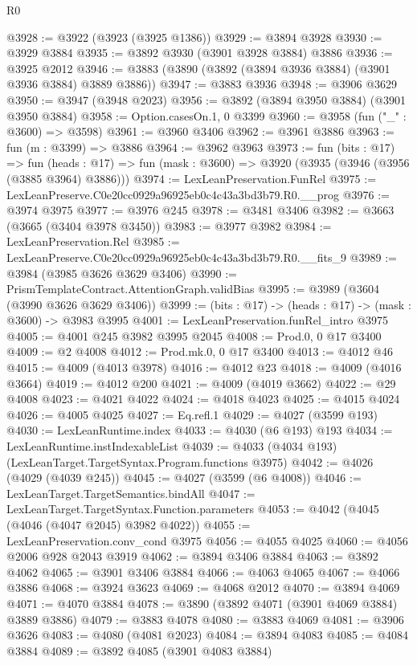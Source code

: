 \begin{lexlean}{R0}
\begin{coremodule}
@3928 := @3922 (@3923 (@3925 @1386))
@3929 := @3894 @3928
@3930 := @3929 @3884
@3935 := @3892 @3930 (@3901 @3928 @3884) @3886
@3936 := @3925 @2012
@3946 := @3883 (@3890 (@3892 (@3894 @3936 @3884) (@3901 @3936 @3884) @3889 @3886))
@3947 := @3883 @3936
@3948 := @3906 @3629
@3950 := @3947 (@3948 @2023)
@3956 := @3892 (@3894 @3950 @3884) (@3901 @3950 @3884)
@3958 := Option.casesOn.{1, 0} @3399
@3960 := @3958 (fun ("_" : @3600) => @3598)
@3961 := @3960 @3406
@3962 := @3961 @3886
@3963 := fun (m : @3399) => @3886
@3964 := @3962 @3963
@3973 := fun (bits : @17) =>
  fun (heads : @17) => fun (mask : @3600) => @3920 (@3935 (@3946 (@3956 (@3885 @3964) @3886)))
@3974 := LexLeanPreservation.FunRel
@3975 := LexLeanPreserve.C0e20cc0929a96925eb0c4c43a3bd3b79.R0.__prog
@3976 := @3974 @3975
@3977 := @3976 @245
@3978 := @3481 @3406
@3982 := @3663 (@3665 (@3404 @3978 @3450))
@3983 := @3977 @3982
@3984 := LexLeanPreservation.Rel
@3985 := LexLeanPreserve.C0e20cc0929a96925eb0c4c43a3bd3b79.R0.__fits_9
@3989 := @3984 (@3985 @3626 @3629 @3406)
@3990 := PrismTemplateContract.AttentionGraph.validBias
@3995 := @3989 (@3604 (@3990 @3626 @3629 @3406))
@3999 := (bits : @17) -> (heads : @17) -> (mask : @3600) -> @3983 @3995
@4001 := LexLeanPreservation.funRel_intro @3975
@4005 := @4001 @245 @3982 @3995 @2045
@4008 := Prod.{0, 0} @17 @3400
@4009 := @2 @4008
@4012 := Prod.mk.{0, 0} @17 @3400
@4013 := @4012 @46
@4015 := @4009 (@4013 @3978)
@4016 := @4012 @23
@4018 := @4009 (@4016 @3664)
@4019 := @4012 @200
@4021 := @4009 (@4019 @3662)
@4022 := @29 @4008
@4023 := @4021 @4022
@4024 := @4018 @4023
@4025 := @4015 @4024
@4026 := @4005 @4025
@4027 := Eq.refl.{1}
@4029 := @4027 (@3599 @193)
@4030 := LexLeanRuntime.index
@4033 := @4030 (@6 @193) @193
@4034 := LexLeanRuntime.instIndexableList
@4039 := @4033 (@4034 @193) (LexLeanTarget.TargetSyntax.Program.functions @3975)
@4042 := @4026 (@4029 (@4039 @245))
@4045 := @4027 (@3599 (@6 @4008))
@4046 := LexLeanTarget.TargetSemantics.bindAll
@4047 := LexLeanTarget.TargetSyntax.Function.parameters
@4053 := @4042 (@4045 (@4046 (@4047 @2045) @3982 @4022))
@4055 := LexLeanPreservation.conv_cond @3975
@4056 := @4055 @4025
@4060 := @4056 @2006 @928 @2043 @3919
@4062 := @3894 @3406 @3884
@4063 := @3892 @4062
@4065 := @3901 @3406 @3884
@4066 := @4063 @4065
@4067 := @4066 @3886
@4068 := @3924 @3623
@4069 := @4068 @2012
@4070 := @3894 @4069
@4071 := @4070 @3884
@4078 := @3890 (@3892 @4071 (@3901 @4069 @3884) @3889 @3886)
@4079 := @3883 @4078
@4080 := @3883 @4069
@4081 := @3906 @3626
@4083 := @4080 (@4081 @2023)
@4084 := @3894 @4083
@4085 := @4084 @3884
@4089 := @3892 @4085 (@3901 @4083 @3884)

\end{coremodule}
\end{lexlean}
